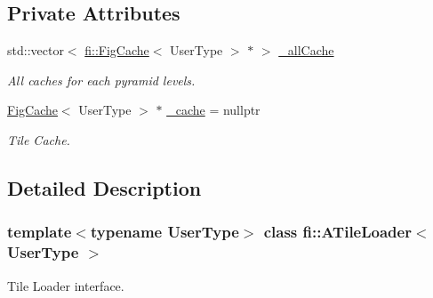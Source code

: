 \subsection*{Private Attributes}
\begin{DoxyCompactItemize}
\item 
std\+::vector$<$ \hyperlink{classfi_1_1FigCache}{fi\+::\+Fig\+Cache}$<$ User\+Type $>$ $\ast$ $>$ \hyperlink{classfi_1_1ATileLoader_a07679e26c08c1f998e00cdf3e1af5d43}{\+\_\+all\+Cache}
\begin{DoxyCompactList}\small\item\em All caches for each pyramid levels. \end{DoxyCompactList}\item 
\hyperlink{classfi_1_1FigCache}{Fig\+Cache}$<$ User\+Type $>$ $\ast$ \hyperlink{classfi_1_1ATileLoader_a35c8ba6cc53333935c03d822b24095b9}{\+\_\+cache} = nullptr
\begin{DoxyCompactList}\small\item\em Tile Cache. \end{DoxyCompactList}\end{DoxyCompactItemize}


\subsection{Detailed Description}
\subsubsection*{template$<$typename User\+Type$>$\newline
class fi\+::\+A\+Tile\+Loader$<$ User\+Type $>$}

Tile Loader interface. 

